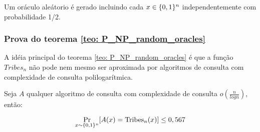 Um oráculo aleátorio é gerado incluindo cada $x \in \{0, 1\}^{n}$ independentemente com probabilidade 1/2. 


\subsubsection{Prova do teorema \ref{teo: P_NP_random_oracles}}

A idéia principal do teorema \ref{teo: P_NP_random_oracles} é que a função $Tribes_{n}$ não pode nem mesmo ser aproximada por algoritmos de consulta com complexidade de consulta polilogarítmica.

\begin{prop} \label{prop: tribes_inaproximability}

Seja $A$ qualquer algoritmo de consulta com complexidade de consulta $o(\frac{n}{logn})$, então:

\begin{equation*}
    \Pr_{x \sim \{0, 1\}^{n}}[A(x) = \text{Tribes}_{n}(x)] \leq 0,567 
\end{equation*}

\end{prop}

